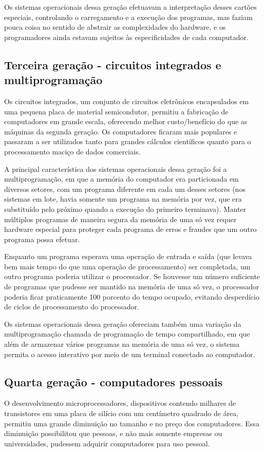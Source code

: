 \documentclass[11pt,twoside,a4paper]{book}
\begin{document}
Os sistemas operacionais dessa geração efetuavam a interpretação desses cartões especiais, controlando o carregamento e a execução dos programas, mas faziam pouca coisa no sentido de abstrair as complexidades do hardware, e os programadores ainda estavam sujeitos às especificidades de cada computador.

\subsection*{Terceira geração - circuitos integrados e multiprogramação}
Os circuitos integrados, um conjunto de circuitos eletrônicos encapsulados em uma pequena placa de material semicondutor, permitiu a fabricação de computadores em grande escala, oferecendo melhor custo/benefício do que as máquinas da segunda geração. Os computadores ficaram mais populares e passaram a ser utilizados tanto para grandes cálculos científicos quanto para o processamento maciço de dados comerciais.

A principal característica dos sistemas operacionais dessa geração foi a multiprogramação, em que a memória do computador era particionada em diversos setores, com um programa diferente em cada um desses setores (nos sistemas em lote, havia somente um programa na memória por vez, que era substituído pelo próximo quando a execução do primeiro terminava). Manter múltiplos programas de maneira segura da memória de uma só vez requer hardware especial para proteger cada programa de erros e fraudes que um outro programa possa efetuar.

Enquanto um programa esperava uma operação de entrada e saída (que levava bem mais tempo do que uma operação de processamento) ser completada, um outro programa poderia utilizar o processador. Se houvesse um número suficiente de programas que pudesse ser mantido na memória de uma só vez, o processador poderia ficar praticamente 100 porcento do tempo ocupado, evitando desperdício de ciclos de processamento do processador.

Os sistemas operacionais dessa geração ofereciam também uma variação da multiprogramação chamada de programação de tempo compartilhado, em que além de armazenar vários programas na memória de uma só vez, o sistema permita o acesso interativo por meio de um terminal conectado ao computador.

\subsection*{Quarta geração - computadores pessoais}
O desenvolvimento microprocessadores, dispositivos contendo milhares de transistores em uma placa de silício com um centímetro quadrado de área, permitiu uma grande diminuição no tamanho e no preço dos computadores. Essa diminuição possibilitou que pessoas, e não mais somente empresas ou universidades, pudessem adquirir computadores para uso pessoal.
\end{document}
